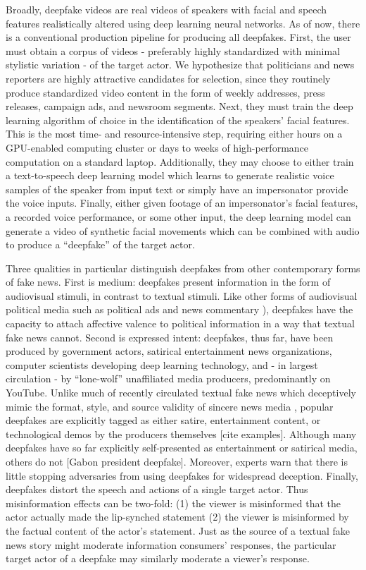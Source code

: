 Broadly, deepfake videos are real videos of speakers with facial and
speech features realistically altered using deep learning neural
networks. As of now, there is a conventional production pipeline for
producing all deepfakes. First, the user must obtain a corpus of
videos - preferably highly standardized with minimal stylistic
variation - of the target actor. We hypothesize that politicians and
news reporters are highly attractive candidates for selection, since
they routinely produce standardized video content in the form of
weekly addresses, press releases, campaign ads, and newsroom
segments. Next, they must train the deep learning algorithm of choice
in the identification of the speakers’ facial features. This is the
most time- and resource-intensive step, requiring either hours on a
GPU-enabled computing cluster or days to weeks of high-performance
computation on a standard laptop. Additionally, they may choose to
either train a text-to-speech deep learning model which learns to
generate realistic voice samples of the speaker from input text or
simply have an impersonator provide the voice inputs. Finally, either
given footage of an impersonator’s facial features, a recorded voice
performance, or some other input, the deep learning model can generate
a video of synthetic facial movements which can be combined with audio
to produce a “deepfake” of the target actor.

Three qualities in particular distinguish deepfakes from other
contemporary forms of fake news. First is medium: deepfakes present
information in the form of audiovisual stimuli, in contrast to textual
stimuli. Like other forms of audiovisual political media such as
political ads and news commentary \citep{mutz2005, ansolabehere1997}),
deepfakes have the capacity to attach affective valence to political
information in a way that textual fake news cannot. Second is
expressed intent: deepfakes, thus far, have been produced by
government actors, satirical entertainment news organizations,
computer scientists developing deep learning technology, and - in
largest circulation - by “lone-wolf” unaffiliated media producers,
predominantly on YouTube. Unlike much of recently circulated textual
fake news which deceptively mimic the format, style, and source
validity of sincere news media \citep{guess2018, allcott2019}, popular
deepfakes are explicitly tagged as either satire, entertainment
content, or technological demos by the producers themselves [cite
  examples]. Although many deepfakes have so far explicitly
self-presented as entertainment or satirical media, others do not
[Gabon president deepfake]. Moreover, experts warn that there is
little stopping adversaries from using deepfakes for widespread
deception. Finally, deepfakes distort the speech and actions of a
single target actor. Thus misinformation effects can be two-fold: (1)
the viewer is misinformed that the actor actually made the lip-synched
statement (2) the viewer is misinformed by the factual content of the
actor’s statement. Just as the source of a textual fake news story
might moderate information consumers’ responses, the particular target
actor of a deepfake may similarly moderate a viewer’s response.

